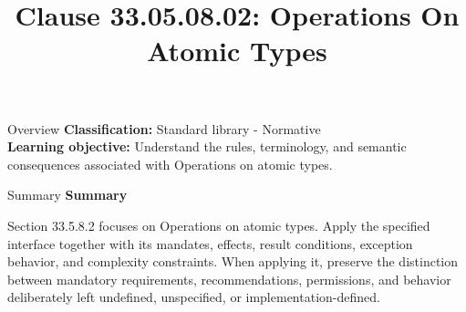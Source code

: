 \documentclass[10pt,letterpaper]{article}
\title{Clause 33.05.08.02: Operations On Atomic Types}
\author{}
\date{}
\begin{document}
\maketitle
\begin{CornellOverviewBox}{Overview}
\textbf{Classification:} Standard library - Normative\\[2pt]
\textbf{Learning objective:} Understand the rules, terminology, and semantic consequences associated with Operations on atomic types.
\end{CornellOverviewBox}\begin{CornellSummaryBox}{Summary}
{\sffamily\bfseries\color{Accent} Summary}\par\vspace{3pt}Section 33.5.8.2 focuses on Operations on atomic types. Apply the specified interface together with its mandates, effects, result conditions, exception behavior, and complexity constraints. When applying it, preserve the distinction between mandatory requirements, recommendations, permissions, and behavior deliberately left undefined, unspecified, or implementation-defined.
\end{CornellSummaryBox}
\end{document}
